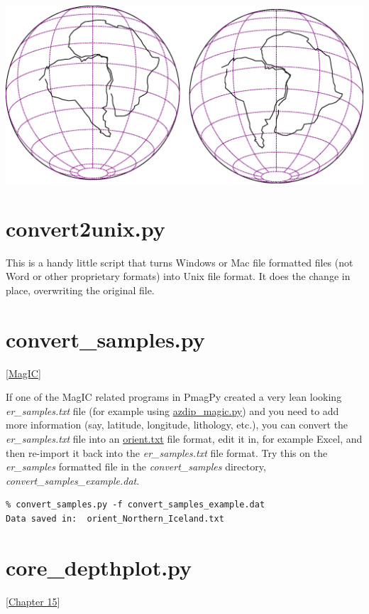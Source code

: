\documentclass[11pt]{book}
\begin{document}
{{{{{{%
\hskip 1cm %
\includegraphics[width=15 cm]{EPSfiles/controt.eps}}

\section{convert2unix.py}

This is a handy little script that turns Windows or Mac file formatted files (not Word or other proprietary formats) into Unix file format.  It does the change in place, overwriting the original file.

\section{convert_samples.py}
\href{#MagIC}{[MagIC]}

If one of the MagIC related programs in PmagPy created a very lean looking {\it er\_samples.txt} file (for example using \href{#azdip_magic.py}{azdip\_magic.py}) and you need to add more information (say, latitude, longitude, lithology, etc.), you can convert the {\it er\_samples.txt} file into an \href{#orientation_magic.py}{orient.txt} file format, edit it in, for example Excel, and then re-import it back into the {\it er\_samples.txt} file format.  Try this on the {\it er\_samples} formatted file in the {\it convert\_samples} directory, {\it convert\_samples\_example.dat}.

\begin{verbatim}
% convert_samples.py -f convert_samples_example.dat 
Data saved in:  orient_Northern_Iceland.txt
\end{verbatim}




\section{core\_depthplot.py} [\href{http://magician.ucsd.edu/Essentials/WebBook2.html#The_GPTS_and_magnetostratigraphy}{Chapter 15}] 
\label{ex:core_depthplot}

}}}}}
\end{document}

